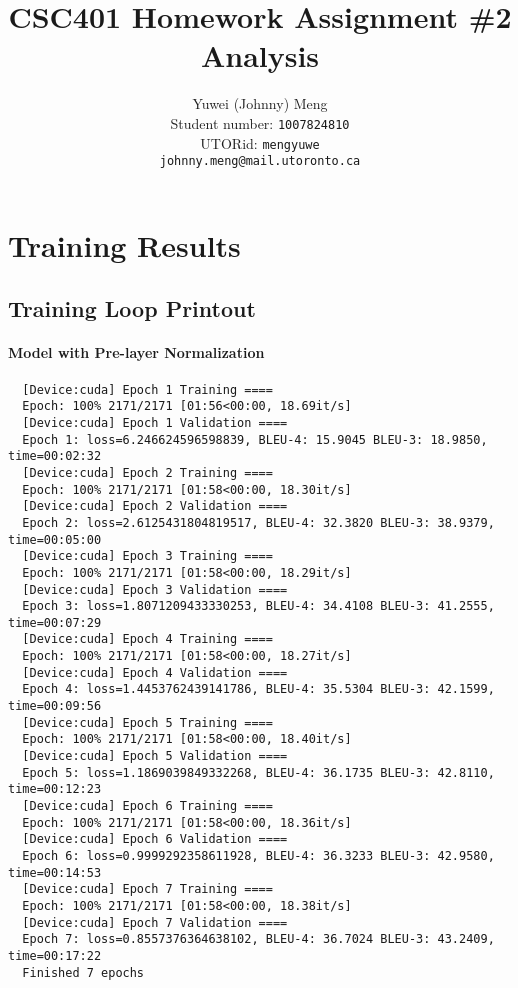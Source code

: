 \documentclass[11pt]{article}
\title{CSC401 Homework Assignment \#2\\Analysis}
\author{Yuwei (Johnny) Meng \\
  Student number: \texttt{1007824810} \\
  UTORid: \texttt{mengyuwe} \\
  \texttt{johnny.meng@mail.utoronto.ca}}
\begin{document}
\maketitle

\section{Training Results}

\subsection{Training Loop Printout}

\paragraph{Model with Pre-layer Normalization}
\begin{small}
\begin{verbatim}
  [Device:cuda] Epoch 1 Training ====
  Epoch: 100% 2171/2171 [01:56<00:00, 18.69it/s]
  [Device:cuda] Epoch 1 Validation ====
  Epoch 1: loss=6.246624596598839, BLEU-4: 15.9045 BLEU-3: 18.9850, time=00:02:32
  [Device:cuda] Epoch 2 Training ====
  Epoch: 100% 2171/2171 [01:58<00:00, 18.30it/s]
  [Device:cuda] Epoch 2 Validation ====
  Epoch 2: loss=2.6125431804819517, BLEU-4: 32.3820 BLEU-3: 38.9379, time=00:05:00
  [Device:cuda] Epoch 3 Training ====
  Epoch: 100% 2171/2171 [01:58<00:00, 18.29it/s]
  [Device:cuda] Epoch 3 Validation ====
  Epoch 3: loss=1.8071209433330253, BLEU-4: 34.4108 BLEU-3: 41.2555, time=00:07:29
  [Device:cuda] Epoch 4 Training ====
  Epoch: 100% 2171/2171 [01:58<00:00, 18.27it/s]
  [Device:cuda] Epoch 4 Validation ====
  Epoch 4: loss=1.4453762439141786, BLEU-4: 35.5304 BLEU-3: 42.1599, time=00:09:56
  [Device:cuda] Epoch 5 Training ====
  Epoch: 100% 2171/2171 [01:58<00:00, 18.40it/s]
  [Device:cuda] Epoch 5 Validation ====
  Epoch 5: loss=1.1869039849332268, BLEU-4: 36.1735 BLEU-3: 42.8110, time=00:12:23
  [Device:cuda] Epoch 6 Training ====
  Epoch: 100% 2171/2171 [01:58<00:00, 18.36it/s]
  [Device:cuda] Epoch 6 Validation ====
  Epoch 6: loss=0.9999292358611928, BLEU-4: 36.3233 BLEU-3: 42.9580, time=00:14:53
  [Device:cuda] Epoch 7 Training ====
  Epoch: 100% 2171/2171 [01:58<00:00, 18.38it/s]
  [Device:cuda] Epoch 7 Validation ====
  Epoch 7: loss=0.8557376364638102, BLEU-4: 36.7024 BLEU-3: 43.2409, time=00:17:22
  Finished 7 epochs
\end{verbatim}
\end{small}
\end{document}
